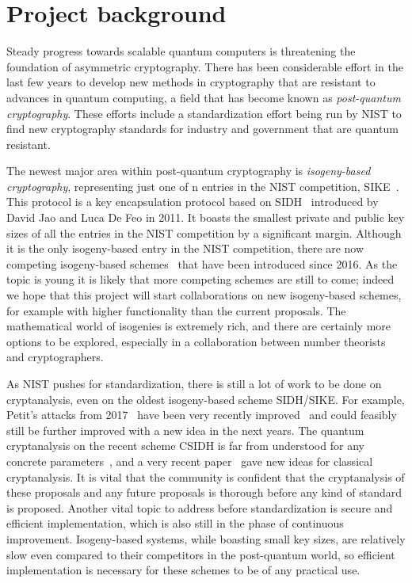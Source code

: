 \documentclass{article}
\begin{document}
\section{Project background}

Steady progress towards scalable quantum computers is threatening the foundation of asymmetric cryptography. 
There has been considerable effort in the last few years to develop new methods in cryptography that are resistant to advances in quantum computing, a field that has become known as \emph{post-quantum cryptography}. 
These efforts include a standardization effort being run by NIST \cite{NIST-comp} to find new cryptography standards for industry and government that are quantum resistant.

The newest major area within post-quantum cryptography is \emph{isogeny-based cryptography}, representing just one of n entries in the NIST competition, SIKE~\cite{SIKE}. 
This protocol is a key encapsulation protocol based on SIDH~\cite{SIDH} introduced by David Jao and Luca De Feo in 2011.
It boasts the smallest private and public key sizes of all the entries in the NIST competition by a significant margin.
Although it is the only isogeny-based entry in the NIST competition,
there are now competing isogeny-based schemes~\cite{CSIDH, CSURF, CSIFiSh}
that have been introduced since 2016.
As the topic is young it is likely that more competing schemes are still to come;
indeed we hope that this project will start collaborations on new isogeny-based schemes, for example with higher functionality than the current proposals.
The mathematical world of isogenies is extremely rich,
and there are certainly more options to be explored, especially in a collaboration between number theorists and cryptographers.

As NIST pushes for standardization, there is still a lot of work to be done on cryptanalysis, even on the oldest isogeny-based scheme SIDH/SIKE. 
For example, Petit's attacks from 2017~\cite{Petit17} 
have been very recently improved~\cite{KMPPS20}
and could feasibly still be further improved with a new idea in the next years.
The quantum cryptanalysis on the recent scheme CSIDH is far from understood for any concrete parameters~\cite{simons-talk},
and a very recent paper~\cite{characters} gave new ideas for classical cryptanalysis.
It is vital that the community is confident that the cryptanalysis of these proposals
and any future proposals is thorough before any kind of standard is proposed.
Another vital topic to address before standardization is secure and efficient implementation, which is also still in the phase of continuous improvement. 
Isogeny-based systems, while boasting small key sizes,
are relatively slow even compared to their competitors in the post-quantum world,
so efficient implementation is necessary for these schemes to be of any practical use.
\end{document}
